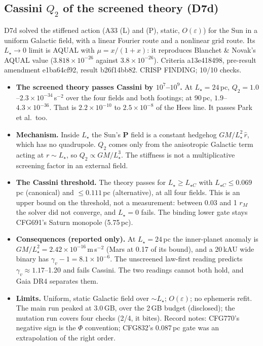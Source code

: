 \documentclass[10pt]{article}
\begin{document}
\subsection{Cassini $Q_2$ of the screened theory (D7d)}
D7d solved the stiffened action (A33 (L) and (P), static, $O(\varepsilon)$) for the Sun in a uniform Galactic field, with a linear Fourier route and a nonlinear grid route. Its $L_\star\to0$ limit is AQUAL with $\mu=x/(1+x)$: it reproduces Blanchet \& Novak's AQUAL value ($3.818\times10^{-26}$ against $3.8\times10^{-26}$). Criteria a13e418498, pre-result amendment e1ba64cf92, result b26f14bb82. CRISP FINDING; 10/10 checks.
\begin{itemize}
\item \textbf{The screened theory passes Cassini by $10^{7}$--$10^{9}$.} At $L_\star=24$\,pc, $Q_2=1.0$--$2.3\times10^{-34}$\,s$^{-2}$ over the four fields and both footings; at 90\,pc, $1.9$--$4.3\times10^{-36}$. That is $2.2\times10^{-10}$ to $2.5\times10^{-8}$ of the Hees line. It passes Park et al.\ too.
\item \textbf{Mechanism.} Inside $L_\star$ the Sun's $\mathbf P$ field is a constant hedgehog $GM/L_\star^2\,\hat r$, which has no quadrupole. $Q_2$ comes only from the anisotropic Galactic term acting at $r\sim L_\star$, so $Q_2\propto GM/L_\star^3$. The stiffness is not a multiplicative screening factor in an external field.
\item \textbf{The Cassini threshold.} The theory passes for $L_\star\ge L_{\star C}$ with $L_{\star C}\le0.069$\,pc (canonical) and $\le0.111$\,pc (alternative), at all four fields. This is an upper bound on the threshold, not a measurement: between 0.03 and 1 $r_M$ the solver did not converge, and $L_\star=0$ fails. The binding lower gate stays CFG691's Saturn monopole (5.75\,pc).
\item \textbf{Consequences (reported only).} At $L_\star=24$\,pc the inner-planet anomaly is $GM/L_\star^2=2.42\times10^{-16}$\,m\,s$^{-2}$ (Mars at 0.17 of its bound), and a 20\,kAU wide binary has $\gamma_v-1=8.1\times10^{-6}$. The unscreened law-first reading predicts $\gamma_v\approx1.17$--1.20 and fails Cassini. The two readings cannot both hold, and Gaia DR4 separates them.
\item \textbf{Limits.} Uniform, static Galactic field over $\sim L_\star$; $O(\varepsilon)$; no ephemeris refit. The main run peaked at 3.0\,GB, over the 2\,GB budget (disclosed); the mutation run covers four checks (2/4, it bites). Record notes: CFG770's negative sign is the $\Phi$ convention; CFG832's 0.087\,pc gate was an extrapolation of the right order.
\end{itemize}
\end{document}
